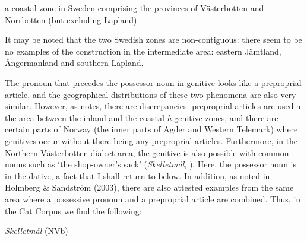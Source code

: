 
\item 

a coastal zone in Sweden comprising the provinces of Västerbotten and Norrbotten (but excluding Lapland).



It may be noted that the two Swedish zones are non-contiguous: there seem to be no examples of the construction in the intermediate area: eastern Jämtland, Ångermanland and southern Lapland. 


The pronoun that precedes the possessor noun in genitive looks like a preproprial article, and the geographical distributions of these two phenomena are also very similar. However, as \citet[67]{Delsing2003b} notes, there are discrepancies: preproprial articles are used\textstyleLinguisticExample{ }in the area between the inland and the coastal \textit{h}{}-genitive zones, and there are certain parts of Norway (the inner parts of Agder and Western Telemark) where genitives occur without there being any preproprial articles. Furthermore, in the Northern Västerbotten dialect area, the genitive is also possible with common nouns such as  ‘the shop-owner’s sack’ (\textit{Skelletmål}, \citet[23]{Marklund1976}). Here, the possessor noun is in the dative, a fact that I shall return to below. In addition, as noted in Holmberg \& Sandström (2003), there are also attested examples from the same area where a possessive pronoun and a preproprial article are combined. Thus, in the Cat Corpus we find the following:


\item 

\textit{Skelletmål} (NVb)

